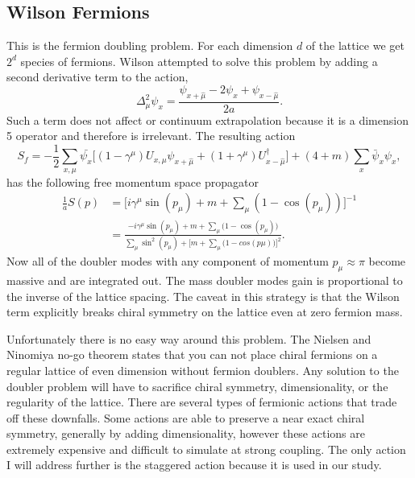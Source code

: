 \subsection{Wilson Fermions}
This is the fermion doubling problem.
For each dimension $d$ of the lattice we get $2^d$ species of fermions.
Wilson attempted to solve this problem by adding a second derivative term to the action,
\begin{equation}
  \Delta_\mu^2\psi_x=\frac{\psi_{x+\hat{\mu}}-2\psi_x+\psi_{x-\hat{\mu}}}{2a}.
\end{equation}
Such a term does not affect or continuum extrapolation because it is a dimension 5 operator and therefore is irrelevant.
The resulting action
\begin{equation}
  S_f=-\frac{1}{2}\sum_{x,\mu}\bar{\psi_x}\Big[(1-\gamma^\mu)U_{x,\mu}\psi_{x+\hat{\mu}}+(1+\gamma^\mu)U^\dagger_{x-\hat{\mu}}\Big]+(4+m)\sum_x\bar{\psi}_x\psi_x,
\end{equation}
has the following free momentum space propagator
\begin{equation}
  \begin{aligned}
    \frac{1}{a}S(p)&=\Big[i\gamma^\mu\sin(p_\mu)+m+\sum_\mu(1-\cos(p_\mu))\Big]^{-1}  \\
                   &=\frac{-i\gamma^\mu\sin(p_\mu)+m+\sum_\mu\big(1-\cos(p_\mu)\big)}{\sum_\mu\sin^2(p_\mu)+\Big[m+\sum_\mu\big(1-cos(p\mu)\big)\Big]^2}.
  \end{aligned}
\end{equation}
Now all of the doubler modes with any component of momentum $p_\mu\approx\pi$ become massive and are integrated out.
The mass doubler modes gain is proportional to the inverse of the lattice spacing.
The caveat in this strategy is that the Wilson term explicitly breaks chiral symmetry on the lattice even at zero fermion mass.

Unfortunately there is no easy way around this problem.
The Nielsen and Ninomiya no-go theorem states that you can not place chiral fermions on a regular lattice of even dimension without fermion doublers.
Any solution to the doubler problem will have to sacrifice chiral symmetry, dimensionality, or the regularity of the lattice.
There are several types of fermionic actions that trade off these downfalls.
Some actions are able to preserve a near exact chiral symmetry, generally by adding dimensionality, however these actions are extremely expensive and difficult to simulate at strong coupling.
The only action I will address further is the staggered action because it is used in our study.

